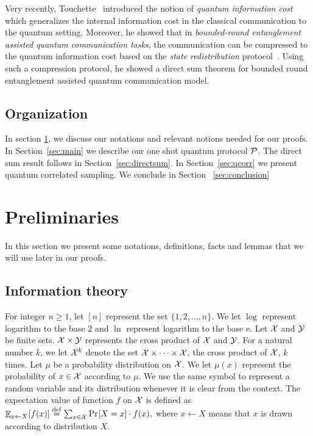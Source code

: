 \documentclass[11pt,a4paper]{article}
\def\P{\CMcal{P}}
\theoremstyle{plain}
\theoremstyle{definition}
\newcommand {\Br} [1] {\ensuremath{ \left[ #1 \right] }}
\newcommand {\minusspace} {\: \! \!}
\newcommand {\Fn} [2] {\ensuremath{ #1 \minusspace \Br{ #2 } }}
\newcommand {\defeq} {\ensuremath{ \stackrel{\mathrm{def}}{=} }}
\newcommand {\prob} [1] {\Fn{\Pr}{#1}}
\DeclareMathOperator*{\bigE}{\mathbb{E}}
\newcommand {\expec} [2] {\Fn{\bigE_{\substack{#1}}}{#2}}
\newcommand {\finset} [1] {\ensuremath{\CMcal{#1}}}
\begin{document}
Very recently, Touchette~\cite{Touchette:2015} introduced the notion of {\em quantum information cost} which generalizes the internal information cost in the classical communication to the quantum setting.  Moreover, he showed that in {\em bounded-round entanglement assisted quantum communication tasks}, the communication can be compressed to the quantum information cost based on the {\em state redistribution} protocol~\cite{DevetakY:2008,YardD:2009}. Using such a compression protocol, he showed a direct sum theorem for bounded round entanglement assisted quantum communication model. 

\subsection*{Organization} In section \ref{sec:Preliminaries}, we discuss our notations and relevant notions needed for our proofs. In Section~\ref{sec:main} we describe our one shot quantum protocol $\P$.  The direct sum result follows in Section~\ref{sec:directsum}. In Section~\ref{sec:qcorr} we present quantum correlated sampling. We conclude in Section ~\ref{sec:conclusion}

\section{Preliminaries}
\label{sec:Preliminaries}

In this section we present some notations, definitions, facts and lemmas that we will use later in our proofs.

\subsection*{Information theory}

For integer $n \geq 1$, let $[n]$ represent the set $\{1,2, \ldots, n\}$.  We let $\log$ represent logarithm to the base $2$ and $\ln$ represent logarithm to the base $\mathrm{e}$. Let $\finset{X}$ and $\finset{Y}$ be finite sets. $\finset{X}\times\finset{Y}$ represents the cross product of $\finset{X}$ and $\finset{Y}$. For a natural number $k$, we let 
$\finset{X}^k$ denote the set $\finset{X}\times\cdots\times\finset{X}$, the cross product of
$\finset{X}$, $k$ times.  Let $\mu$ be a probability distribution on $\finset{X}$. We let $\mu(x)$ represent the probability of $x\in\finset{X}$ according to $\mu$. We use the same symbol to represent a random variable and its distribution whenever it is clear from the context. The expectation value of function $f$ on $\finset{X}$ is defined as
$\expec{x \leftarrow X}{f(x)} \defeq \sum_{x \in \finset{X}} \prob{X=x}
\cdot f(x),$ where $x\leftarrow X$ means that $x$ is drawn according to distribution $X$.
\end{document}
